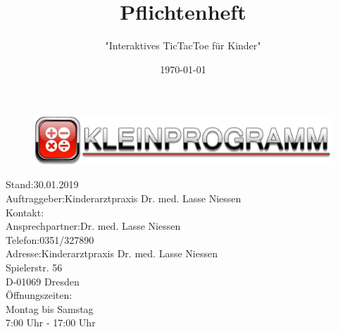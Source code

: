 \documentclass[12pt]{article}
\title{\textbf{Pflichtenheft}}
\author{"Interaktives \Gls{TicTacToe} für Kinder"}
\date{\today} %
\begin{document}
\begin{titlepage}
	\centering	
	\begin{figure}
	\includegraphics[scale=0.9]{banner.pdf} %
	\end{figure}
	\maketitle
	\thispagestyle{empty}
	
	\vspace*{1cm}	
	
	\begin{flushleft}
	Stand:\hspace*{31mm}30.01.2019\\
	Auftraggeber:\hspace*{17mm}Kinderarztpraxis Dr. med. Lasse Niessen\\
	Kontakt:\\
		\hspace*{5mm}Ansprechpartner:\hspace*{6mm}Dr. med. Lasse Niessen\\
		\hspace*{5mm}Telefon:\hspace*{23mm}0351/327890\\
		\hspace*{5mm}Adresse:\hspace*{22mm}Kinderarztpraxis Dr. med. Lasse Niessen\\
							\hspace*{42mm}Spielerstr. 56\\
							\hspace*{42mm}D-01069 Dresden\\
	
	Öffnungszeiten:\\
		\hspace*{42mm}Montag bis Samstag\\
		\hspace*{42mm}7:00 Uhr - 17:00 Uhr\\
	\end{flushleft}

	\vspace*{1cm}
	

\end{titlepage}
\end{document}
